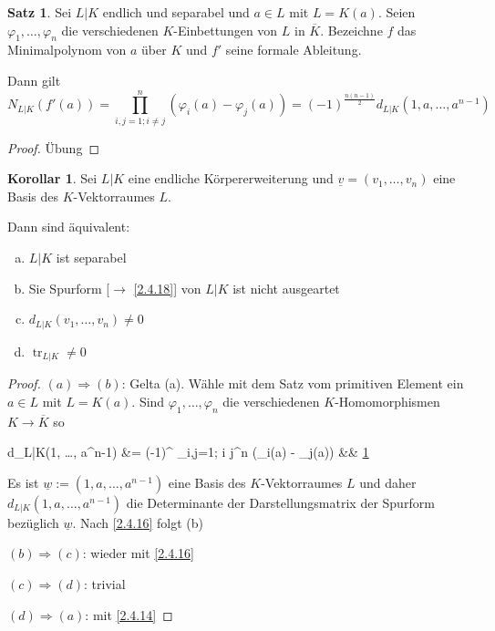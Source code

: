 \documentclass[
twoside=semi,
fontsize=12,
DIV=12, 
cleardoublepage=current,
leqno,
headings=optiontoheadandtoc, 
toc=idx
]{scrbook}
\DeclareMathOperator{\tr}{tr}
\theoremstyle{definition}
\newtheorem{satz}[definition]{Satz}
\newtheorem{korollar}[definition]{Korollar}
\begin{document}
	\begin{satz}\label{2.4.22}
		Sei $L|K$ endlich und separabel und $a \in L$ mit $L=K(a)$. Seien $\varphi_1, \dots, \varphi_n$ die verschiedenen $K$-Einbettungen von $L$ in $\overline{K}$. Bezeichne $f$ das Minimalpolynom von $a$ \"uber $K$ und $f'$ seine formale Ableitung.
		
		Dann gilt 
			\[N_{L|K}(f'(a)) = \prod_{i,j=1; i \neq j}^n (\varphi_i(a)- \varphi_j(a)) = (-1)^{\frac{n(n-1)}{2}}d_{L|K}(1,a,\dots, a^{n-1}) \]
			
		\begin{proof}
			\"Ubung
		\end{proof} 
	\end{satz}

	\begin{korollar}\label{2.4.23}
		Sei $L|K$ eine endliche K\"orpererweiterung und $\underline{v} =(v_1, \dots, v_n)$ eine Basis des $K$-Vektorraumes $L$.
		
		Dann sind \"aquivalent:
		
		\begin{enumerate}[(a)]
			\item $L|K$ ist separabel
			\item Sie Spurform [$\to$ \ref{2.4.18}] von $L|K$ ist nicht ausgeartet
			\item $d_{L|K}(v_1, \dots, v_n) \neq 0$
			\item $\tr_{L|K} \neq 0$
		\end{enumerate}
	
		\begin{proof}
			$(a)\Rightarrow (b)$: Gelta (a). W\"ahle mit dem Satz vom primitiven Element ein $a \in L$ mit $L= K(a)$. Sind $\varphi_1, \dots, \varphi_n$ die verschiedenen $K$-Homomorphismen $K \to \overline{K}$ so 
			\begin{flalign*}
				d_{L|K}(1, \dots, a^{n-1}) &= (-1)^{} \prod_{i,j=1; i \neq j}^{n} (\varphi_i(a) - \varphi_j(a)) && \ref{2.4.22}
			\end{flalign*}
		
			Es ist $\underline{w} := (1, a, \dots, a^{n-1})$ eine Basis des $K$-Vektorraumes $L$ und daher $d_{L|K}(1, a, \dots, a^{n-1})$ die Determinante der Darstellungsmatrix der Spurform bez\"uglich $\underline{w}$. Nach \ref{2.4.16} folgt (b)
			
			
			$(b)\Rightarrow (c)$: wieder mit \ref{2.4.16}
			
			$(c)\Rightarrow (d)$: trivial
			
			$(d) \Rightarrow (a)$: mit \ref{2.4.14}
		\end{proof}
 	\end{korollar}
 
\end{document}
